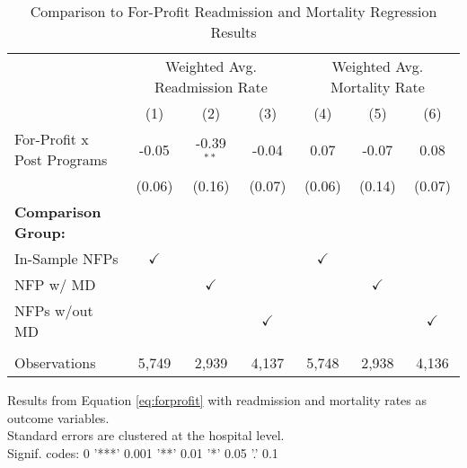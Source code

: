 \begin{table}[ht!]
   \caption{\label{tab:forprofit_readmort_fullsample} Comparison to For-Profit Readmission and Mortality Regression Results}
   \bigskip
   \centering
   \begin{tabular}{lcccccc}
      \toprule
       & \multicolumn{3}{c}{Weighted Avg. Readmission Rate} & \multicolumn{3}{c}{Weighted Avg. Mortality Rate}\\
                                  & (1)           & (2)           & (3)           & (4)           & (5)           & (6)\\  
      \midrule 
      For-Profit x Post Programs  & -0.05         & -0.39$^{**}$  & -0.04         & 0.07          & -0.07         & 0.08\\   
                                  & (0.06)        & (0.16)        & (0.07)        & (0.06)        & (0.14)        & (0.07)\\   
      \textbf{Comparison Group:}  &               &               &               &               &               & \\  
      In-Sample NFPs              & $\checkmark$  &               &               & $\checkmark$  &               & \\  
      NFP w/ MD                   &               & $\checkmark$  &               &               & $\checkmark$  & \\  
      NFPs w/out MD               &               &               & $\checkmark$  &               &               & $\checkmark$\\   
       \\
      Observations                & 5,749         & 2,939         & 4,137         & 5,748         & 2,938         & 4,136\\  
      \bottomrule
   \end{tabular}
   
   \par \raggedright 
   Results from Equation \ref{eq:forprofit} with readmission and mortality rates as outcome variables.\\
   Standard errors are clustered at the hospital level.\\
   Signif. codes: 0 '***' 0.001 '**' 0.01 '*' 0.05 '.' 0.1
\end{table}
